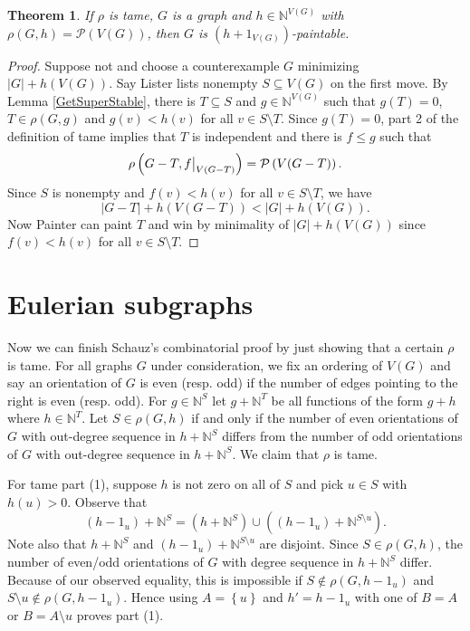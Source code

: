 \documentclass[12pt]{article}
\theoremstyle{plain}
\newtheorem{thm}{Theorem}[section]
\theoremstyle{definition}
\theoremstyle{remark}
\newcommand{\IN}{\mathbb{N}}
\newcommand{\set}[1]{\left\{ #1 \right\}}
\newcommand{\card}[1]{\left|#1\right|}
\newcommand{\parens}[1]{\left( #1 \right)}
\newcommand\restr[2]{{%
  \left.\kern-\nulldelimiterspace %
  #1 %
  \vphantom{\big|} %
  \right|_{#2} %
  }}
\newcommand{\powset}[1]{\mathcal{P}\parens{#1}}
\begin{document}
\begin{thm}\label{TameRhoWins}
	If $\rho$ is tame, $G$ is a graph and $h \in \IN^{V(G)}$ with $\rho(G, h) = \powset{V(G)}$, then $G$ is $(h + 1_{V(G)})$-paintable.
\end{thm}
\begin{proof}
	Suppose not and choose a counterexample $G$ minimizing $|G| + h(V(G))$.  Say Lister lists nonempty $S \subseteq V(G)$ on the first move.
	By Lemma \ref{GetSuperStable}, there is $T \subseteq S$ and $g \in \IN^{V(G)}$ such that $g(T) = 0$, $T \in \rho(G, g)$ and $g(v) < h(v)$ for all $v \in S\setminus T$.
	Since $g(T) = 0$, part 2 of the definition of tame implies that $T$ is independent and there is $f \le g$ such that
	\[\rho\parens{G - T, \restr{f}{V(G-T)}} = \powset{V(G-T)}.\]
	Since $S$ is nonempty and $f(v) < h(v)$ for all $v \in S\setminus T$, we have 
	\[\card{G-T} + h(V(G-T)) < \card{G} + h(V(G)).\]
	Now Painter can paint $T$ and win by minimality of $|G| + h(V(G))$ since $f(v) < h(v)$ for all $v \in S\setminus T$.
\end{proof}


\section{Eulerian subgraphs}
Now we can finish Schauz's combinatorial proof by just showing that a certain $\rho$ is tame.  For all graphs $G$ under consideration, we fix an ordering of $V(G)$ and say an orientation of $G$ is even (resp. odd) if the number of edges pointing to the right is even (resp. odd).  For $g \in \IN^S$ let $g + \IN^T$ be all functions of the form $g + h$ where $h \in \IN^T$. Let $S \in \rho(G, h)$ if and only if the number of even orientations of $G$ with out-degree sequence in $h + \IN^S$ differs from the number of odd orientations of $G$ with out-degree sequence in $h + \IN^S$.  We claim that $\rho$ is tame.  

For tame part (1), suppose $h$ is not zero on all of $S$ and pick $u \in S$ with $h(u) > 0$.  Observe that 
\[(h - 1_u) + \IN^S = (h + \IN^S) \cup ((h - 1_u) + \IN^{S \setminus u}).\]
Note also that $h + \IN^S$ and $(h - 1_u) + \IN^{S \setminus u}$ are disjoint.  Since $S \in \rho(G, h)$, the number of even/odd orientations of $G$ with degree sequence in $h + \IN^S$ differ.  
Because of our observed equality, this is impossible if $S \not \in \rho(G, h - 1_u)$ and $S \setminus u \not \in \rho(G, h - 1_u)$. 
Hence using $A = \set{u}$ and $h' = h - 1_u$ with one of $B=A$ or $B = A \setminus u$ proves part (1).
\end{document}
